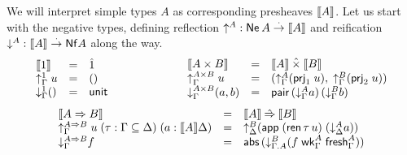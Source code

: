\documentclass[a4paper,USenglish,cleveref, autoref]{lipics-v2019}
\begin{document}
We will interpret simple types $A$ as corresponding presheaves
$\den A$.  Let us start with the negative types, defining
reflection $\up A : \tNe\, A \todot \den A$
and reification $\down A : \den A \todot \tNf A$ along the way.
\[
\begin{array}{lcl}
  \den   \tyone          & = & \hatone \\
  \upG   \tyone \; u     & = & \ttempty \\
  \downG \tyone \ttempty & = & \tunit \\
\end{array}
\qquad\qquad\qquad
\begin{array}{lcl}
  \den   {A \times B}       & = & \den A \hattimes \den B \\
  \upG   {A \times B} \; u  & = & (\upG A (\prj1 u),\;\upG B (\prj2 u)) \\
  \downG {A \times B} (a,b) & = & \tpair\,(\downG A a)\,(\downG B b) \\
\end{array}
\]
\[
\begin{array}{lcl}
  \den {A \To B}    & = & \den A \hatto \den B \\
  \upG   {A \To B}    \; u \; (\tau : \Gamma \sublist \Delta) \; (a : \den A \Delta)
     & = & \up[\Delta] B (\tapp\;(\tren\,\tau\, u)\;(\down[\Delta] A a)) \\
  \downG {A \To B}    f        & = & \tabs\,(\down[\cext \Gamma A] B
    (f\;\twk^A_\Gamma\;\tfresh^A_\Gamma))
\end{array}
\]
\end{document}
